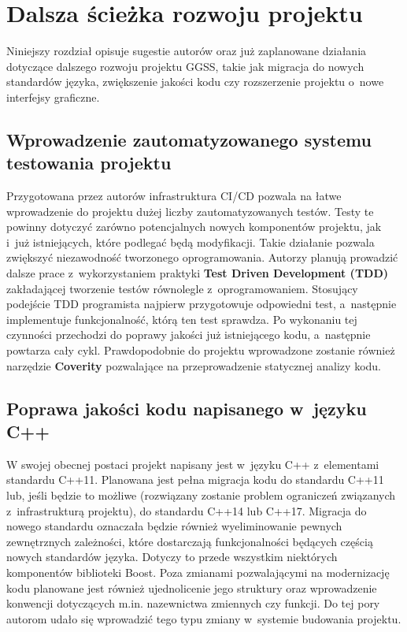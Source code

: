 \chapter{Dalsza ścieżka rozwoju projektu}
\label{cha:dalsze}
Niniejszy rozdział opisuje sugestie autorów oraz już zaplanowane działania dotyczące dalszego rozwoju projektu GGSS, takie jak migracja do nowych standardów języka, zwiększenie jakości kodu czy rozszerzenie projektu o~nowe interfejsy graficzne.

\section{Wprowadzenie zautomatyzowanego systemu testowania projektu}
Przygotowana przez autorów infrastruktura CI/CD pozwala na łatwe wprowadzenie do projektu dużej liczby zautomatyzowanych testów. Testy te powinny dotyczyć zarówno potencjalnych nowych komponentów projektu, jak i~już istniejących, które podlegać będą modyfikacji. Takie działanie pozwala zwiększyć niezawodność tworzonego oprogramowania. Autorzy planują prowadzić dalsze prace z~wykorzystaniem praktyki \textbf{Test Driven Development (TDD)} zakładającej tworzenie testów równolegle z~oprogramowaniem. Stosujący podejście TDD programista najpierw przygotowuje odpowiedni test, a~następnie implementuje funkcjonalność, którą ten test sprawdza. Po wykonaniu tej czynności przechodzi do poprawy jakości już istniejącego kodu, a~następnie powtarza cały cykl. Prawdopodobnie do projektu wprowadzone zostanie również narzędzie \textbf{Coverity} pozwalające na przeprowadzenie statycznej analizy kodu.

\section{Poprawa jakości kodu napisanego w~języku C++}
W swojej obecnej postaci projekt napisany jest w~języku C++ z~elementami standardu C++11. Planowana jest pełna migracja kodu do standardu C++11 lub, jeśli będzie to możliwe (rozwiązany zostanie problem ograniczeń związanych z~infrastrukturą projektu), do standardu C++14 lub C++17. Migracja do nowego standardu oznaczała będzie również wyeliminowanie pewnych zewnętrznych zależności, które dostarczają funkcjonalności będących częścią nowych standardów języka. Dotyczy to przede wszystkim niektórych komponentów biblioteki Boost. Poza zmianami pozwalającymi na modernizację kodu planowane jest również ujednolicenie jego struktury oraz wprowadzenie konwencji dotyczących m.in. nazewnictwa zmiennych czy funkcji. Do tej pory autorom udało się wprowadzić tego typu zmiany w~systemie budowania projektu. 

